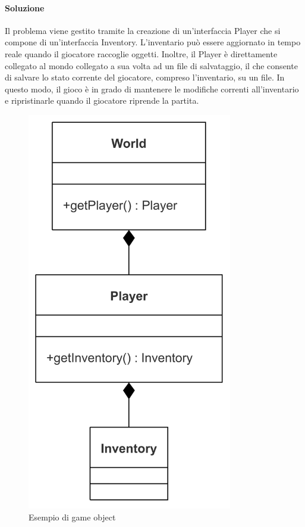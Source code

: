 \documentclass[a4paper,12pt]{report}
\begin{document}
\paragraph{Soluzione}Il problema viene gestito tramite la creazione di un’interfaccia Player che si compone di un’interfaccia Inventory. 
L'inventario può essere aggiornato in tempo reale quando il giocatore raccoglie oggetti. 
Inoltre, il Player è direttamente collegato al mondo collegato a sua volta ad un file di salvataggio, il che consente di salvare lo stato corrente del giocatore, compreso l'inventario, su un file. 
In questo modo, il gioco è in grado di mantenere le modifiche correnti all'inventario e ripristinarle quando il giocatore riprende la partita. %
%
\begin{figure}[h]  %
    \centering
    \includegraphics[width=0.8\textwidth]{img/player.png}  %
    \caption{Esempio di game object}
    \label{img:gameObject}
\end{figure}
%
\end{document}
